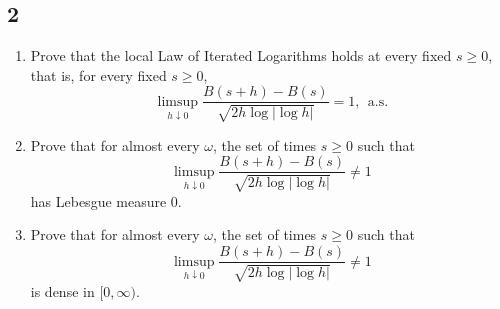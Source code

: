 \documentclass[12pt]{article}
\begin{document}
\subsection*{2}
\begin{tcolorbox}
  \begin{enumerate}[label=(\roman*)]
      \item Prove that the local Law of Iterated Logarithms holds at every fixed $s \geq 0$, that is, for every fixed $s \geq 0$,
      \[
        \limsup_{h\downarrow 0} \frac{B(s + h) - B(s)}{\sqrt{2h\log|\log h|}} = 1, \ \ \text{a.s.}
      \]
    \item Prove that for almost every $\omega$, the set of times $s \geq 0$ such that
      \[
        \limsup_{h\downarrow 0} \frac{B(s + h) - B(s)}{\sqrt{2h\log|\log h|}} \neq 1
      \]
      has Lebesgue measure 0.
    \item Prove that for almost every $\omega$, the set of times $s \geq 0$ such that
      \[
        \limsup_{h\downarrow 0} \frac{B(s + h) - B(s)}{\sqrt{2h\log|\log h|}} \neq 1
      \]
      is dense in $[0, \infty)$.
  \end{enumerate}
\end{tcolorbox}
\end{document}
